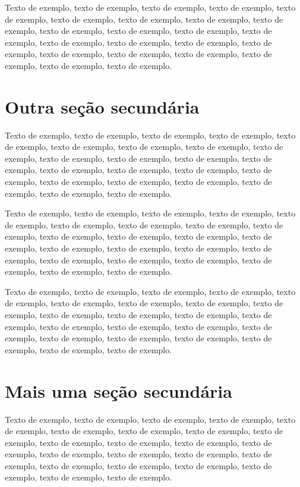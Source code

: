 \documentclass[
	12pt,				%
	oneside,			%
	a4paper,			%
	english,			%
	brazil				%
	]{abntex2ppgsi}
\begin{document}
Texto de exemplo, texto de exemplo, texto de exemplo, texto de exemplo, texto de exemplo, texto de exemplo, texto de exemplo, texto de exemplo, texto de exemplo, texto de exemplo, texto de exemplo, texto de exemplo, texto de exemplo, texto de exemplo, texto de exemplo, texto de exemplo, texto de exemplo, texto de exemplo, texto de exemplo, texto de exemplo, texto de exemplo, texto de exemplo, texto de exemplo.

\section{Outra seção secundária}

Texto de exemplo, texto de exemplo, texto de exemplo, texto de exemplo, texto de exemplo, texto de exemplo, texto de exemplo, texto de exemplo, texto de exemplo, texto de exemplo, texto de exemplo, texto de exemplo, texto de exemplo, texto de exemplo, texto de exemplo, texto de exemplo, texto de exemplo, texto de exemplo, texto de exemplo, texto de exemplo, texto de exemplo, texto de exemplo, texto de exemplo.

Texto de exemplo, texto de exemplo, texto de exemplo, texto de exemplo, texto de exemplo, texto de exemplo, texto de exemplo, texto de exemplo, texto de exemplo, texto de exemplo, texto de exemplo, texto de exemplo, texto de exemplo, texto de exemplo, texto de exemplo, texto de exemplo, texto de exemplo, texto de exemplo, texto de exemplo, texto de exemplo, texto de exemplo, texto de exemplo, texto de exemplo.

Texto de exemplo, texto de exemplo, texto de exemplo, texto de exemplo, texto de exemplo, texto de exemplo, texto de exemplo, texto de exemplo, texto de exemplo, texto de exemplo, texto de exemplo, texto de exemplo, texto de exemplo, texto de exemplo, texto de exemplo, texto de exemplo, texto de exemplo, texto de exemplo, texto de exemplo, texto de exemplo, texto de exemplo, texto de exemplo, texto de exemplo.

\section{Mais uma seção secundária}

Texto de exemplo, texto de exemplo, texto de exemplo, texto de exemplo, texto de exemplo, texto de exemplo, texto de exemplo, texto de exemplo, texto de exemplo, texto de exemplo, texto de exemplo, texto de exemplo, texto de exemplo, texto de exemplo, texto de exemplo, texto de exemplo, texto de exemplo, texto de exemplo, texto de exemplo, texto de exemplo, texto de exemplo, texto de exemplo, texto de exemplo.
\end{document}
